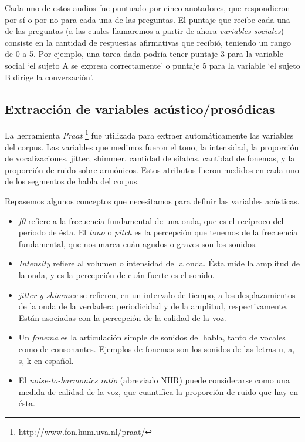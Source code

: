 \noindent Cada uno de estos audios fue puntuado por cinco anotadores, que respondieron por sí o por no para cada una de las preguntas. El puntaje que recibe cada una de las preguntas (a las cuales llamaremos a partir de ahora \emph{variables sociales}) consiste en la cantidad de respuestas afirmativas que recibió, teniendo un rango de 0 a 5. Por ejemplo, una tarea dada podría tener puntaje 3 para la variable social `el sujeto A se expresa correctamente' o puntaje 5 para la variable `el sujeto B dirige la conversación'.

\subsection{Extracción de variables acústico/prosódicas}

La herramienta \emph{Praat} \footnote{http://www.fon.hum.uva.nl/praat/} fue utilizada para extraer automáticamente las variables \ap del corpus. Las variables que medimos fueron el tono, la intensidad, la proporción de vocalizaciones, jitter, shimmer, cantidad de sílabas, cantidad de fonemas, y la proporción de ruido sobre armónicos. Estos atributos fueron medidos en cada uno de los segmentos de habla del corpus.

Repasemos algunos conceptos que necesitamos para definir las variables acústicas.

\begin{itemize}
  \item \emph{f0} refiere a la frecuencia fundamental de una onda, que es el recíproco del período de ésta. El \emph{tono} o \emph{pitch} es la percepción que tenemos de la frecuencia fundamental, que nos marca cuán agudos o graves son los sonidos.
  \item \emph{Intensity} refiere al volumen o intensidad de la onda. Ésta mide la amplitud de la onda, y es la percepción de cuán fuerte es el sonido.
  \item \emph{jitter y shimmer} se refieren, en un intervalo de tiempo, a los desplazamientos de la onda de la verdadera periodicidad y de la amplitud, respectivamente. Están asociadas con la percepción de la calidad de la voz.
  \item Un \emph{fonema} es la articulación simple de sonidos del habla, tanto de vocales como de consonantes. Ejemplos de fonemas son los sonidos de las letras u, a, s, k en español.
  \item El \emph{noise-to-harmonics ratio} (abreviado NHR) puede considerarse como una medida de calidad de la voz, que cuantifica la proporción de ruido que hay en ésta.
\end{itemize}


